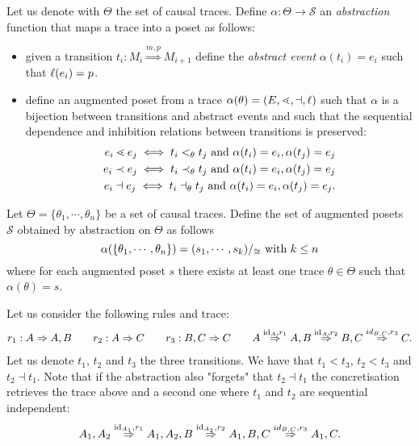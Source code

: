 \begin{definition}
  \label{def:abstraction}
  Let us denote with $\Theta$ the set of causal traces.
  Define $\alpha:\Theta\to\mathcal{S}$ an \emph{abstraction} function that maps a trace into a poset as follows:
  \begin{itemize}
  \item given a transition $t_i:M_i\overset{m,p}{\Rightarrow} M_{i+1}$ define the \emph{abstract event} $\alpha(t_i) = e_i$ such that $\ell(e_i) = p$.
  \item define an augmented poset from a trace $\alpha(\theta) = (E,\lessdot,\dashv,\ell)$ such that $\alpha$ is a bijection between transitions and abstract events and such that the sequential dependence and inhibition relations between transitions is preserved:
    \begin{align*}
      e_i \lessdot e_j \iff t_i <_{\theta} t_j \text{ and } \alpha(t_i)=e_i, \alpha(t_j)=e_j\\
      e_i \prec e_j \iff t_i \prec_{\theta} t_j \text{ and } \alpha(t_i)=e_i, \alpha(t_j)=e_j\\
      e_i \dashv e_j \iff t_i \dashv_{\theta} t_j \text{ and } \alpha(t_i)=e_i, \alpha(t_j)=e_j.
    \end{align*}
  \end{itemize}
  Let $\Theta = \{\theta_1,\cdots,\theta_n\}$ be a set of causal traces.
  Define the set of augmented posets $\mathcal{S}$ obtained by abstraction on $\Theta$ as follows
  \[
  \alpha(\{\theta_1,\cdots,\theta_n\}) = (s_1,\cdots, s_k)/_{\cong}\text{ with }k\leq n
  \]
  where for each augmented poset $s$ there exists at least one trace $\theta\in\Theta$ such that $\alpha(\theta) = s$.
\end{definition}

\begin{example}
  Let us consider the following rules and trace:
  \begin{align*}
    r_1:A \Rightarrow A, B\qquad r_2:A \Rightarrow C \qquad r_3: B,C \Rightarrow C\qquad
    A \overset{\text{id}_A,r_1}{\Rightarrow} A, B \overset{\text{id}_A,r_2}{\Rightarrow} B,C \overset{id_{B,C},r_3}{\Rightarrow}C.
  \end{align*}
  Let us denote $t_1$, $t_2$ and $t_3$ the three transitions. We have that $t_1<t_3$, $t_2<t_3$ and $t_2\dashv t_1$.
  Note that if the abstraction also "forgets" that $t_2\dashv t_1$ the concretisation retrieves the trace above and a second one where $t_1$ and $t_2$ are sequential independent:
  \begin{align*}
    A_1,A_2 \overset{\text{id}_{A_1},r_1}{\Rightarrow} A_1,A_2,B \overset{\text{id}_{A_2},r_2}{\Rightarrow} A_1,B,C \overset{id_{B,C},r_3}{\Rightarrow} A_1,C.
  \end{align*}
\end{example}

